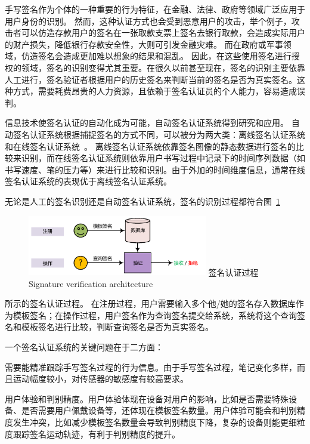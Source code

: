 手写签名作为个体的一种重要的行为特征，在金融、法律、政府等领域广泛应用于用户身份的识别。 然而，这种认证方式也会受到恶意用户的攻击，举个例子，攻击者可以仿造存款用户的签名在一张取款支票上签名去银行取款，会造成实际用户的财产损失，降低银行存款安全性，大则可引发金融灾难。 而在政府或军事领域，仿造签名会造成更加难以想象的结果和混乱。 因此，在这些使用签名进行授权的领域，签名的识别变得尤其重要。在很久以前甚至现在，签名的识别主要依靠人工进行，签名验证者根据用户的历史签名来判断当前的签名是否为真实签名。这种方式，需要耗费昂贵的人力资源，且依赖于签名认证员的个人能力，容易造成误判。

信息技术使签名认证的自动化成为可能，自动签名认证系统得到研究和应用。 自动签名认证系统根据捕捉签名的方式不同，可以被分为两大类：离线签名认证系统和在线签名认证系统~\cite{鄢晨丹基于统计模型的}。 离线签名认证系统依靠签名图像的静态数据进行签名的比较来识别，而在线签名认证系统则依靠用户书写过程中记录下的时间序列数据（如书写速度、笔的压力等）来进行比较和识别。由于外加的时间维度信息，通常在线签名认证系统的表现优于离线签名认证系统。



无论是人工的签名识别还是自动签名认证系统，签名的识别过程都符合图~\ref{fig:signature-verification-architecture}
\begin{figure}[!htp]
  \centering
  \includegraphics[width=0.7\textwidth]{figure/verification-work-flow.pdf}
  \bicaption
    {签名认证过程}
    {Signature verification architecture}
  \label{fig:signature-verification-architecture}
\end{figure}所示的签名认证过程。 在注册过程，用户需要输入多个他/她的签名存入数据库作为模板签名；在操作过程，用户签名作为查询签名提交给系统，系统将这个查询签名和模板签名进行比较，判断查询签名是否为真实签名。

一个签名认证系统的关键问题在于二方面：
\begin{enumerate*}[label=\itshape\alph*)\upshape]
    \item 需要能精准跟踪手写签名过程的行为信息。由于手写签名过程，笔记变化多样，而且运动幅度较小，对传感器的敏感度有较高要求。
    \item 用户体验和判别精度。用户体验体现在设备对用户的影响，比如是否需要特殊设备、是否需要用户佩戴设备等，还体现在模板签名数量。用户体验可能会和判别精度发生冲突，比如减少模板签名数量会导致判别精度下降，复杂的设备则能更细粒度跟踪签名运动轨迹，有利于判别精度的提升。
\end{enumerate*}

